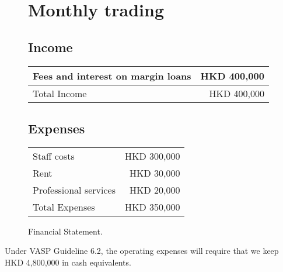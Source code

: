 \begin{figure}[h]
  \centering
  \caption{Financial Statement.}
  \label{fig:financial_statement}
  
  \section*{Monthly trading }
  
  \subsection*{Income}
  \begin{tabular}{lr}
    Fees and interest on margin loans & HKD 400,000 \\
    \midrule
    Total Income & HKD 400,000 \\
  \end{tabular}
  
  \subsection*{Expenses}
  \begin{tabular}{lr}
    Staff costs & HKD 300,000 \\
    Rent & HKD 30,000 \\
    Professional services & HKD 20,000 \\
    \midrule
    Total Expenses & HKD 350,000 \\
  \end{tabular}
\end{figure}

Under VASP Guideline 6.2, the operating expenses will require that we keep
HKD 4,800,000 in cash equivalents.
